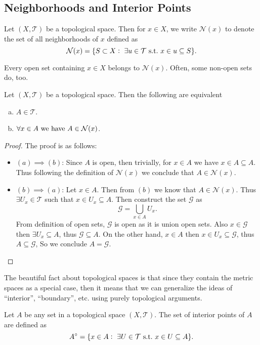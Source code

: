 \subsection{Neighborhoods and Interior Points}
\begin{definition}
	Let $(X,\mathcal{T})$ be a topological space. Then for $x\in X$, we write $\mathcal{N}(x)$ to denote the set of all neighborhoods of $x$ defined as 
	\[ \mathcal{N}(x) = \{ S \subset X:\ \exists u\in\mathcal{T} \ \text{s.t.}\  x\in u \subseteq S \}. \]
\end{definition}
Every open set containing $x\in X$ belongs to $\mathcal{N}(x)$. Often, some non-open sets do, too.

\begin{lemma}{}
	Let $(X, \mathcal{T})$ be a topological space. Then the following are equivalent
	\begin{enumerate}[(a)]
		\item $A \in \mathcal{T}$.
		\item $\forall x\in A \ \text{we have}\  A \in \mathcal{N}(x)$.
	\end{enumerate}
\end{lemma}
\begin{proof} The proof is as follows: 
	\begin{itemize}
		\item $(a) \implies (b)$: Since $A$ is open, then trivially, for $x\in A$ we have $x\in A \subseteq A$. Thus following the definition of $\mathcal{N}(x)$ we conclude that $A \in  \mathcal{N}(x)$.
		\item $(b) \implies (a)$: Let $x \in A$. Then from $(b)$ we know that $A \in  \mathcal{N}(x)$. Thus $\exists U_x \in \mathcal{T}$ such that $x\in U_x \subseteq A$. Then construct the set $\mathcal{G}$ as 
		\[ \mathcal{G} = \bigcup_{x\in A} U_x. \]
		From definition of open sets, $\mathcal{G}$ is open as it is union open sets. Also $x \in \mathcal{G}$ then $\exists U_x \subseteq A$, thus $\mathcal{G} \subseteq A$. On the other hand, $x\in A$ then $x\in U_x \subseteq \mathcal{G}$, thus $A \subseteq \mathcal{G}$, So we conclude $A = \mathcal{G}$.
	\end{itemize}
\end{proof}

The beautiful fact about topological spaces is that since they contain the metric spaces as a special case, then it means that we can generalize the ideas of ``interior'', ``boundary'', etc. using purely topological arguments.

\begin{definition}
	Let $A$ be any set in a topological space $(X,\mathcal{T})$. The set of interior points of $A$ are defined as
	\[ A^{\circ} = \{ x\in A:\ \exists U\in \mathcal{T} \st x\in U \subseteq A \}. \]
\end{definition}

